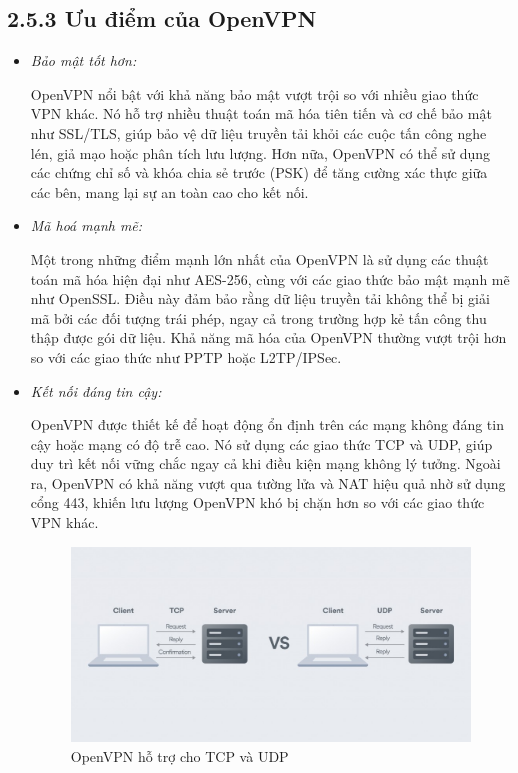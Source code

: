 \subsection*{2.5.3 Ưu điểm của OpenVPN}

\begin{itemize}
        \item \textit{Bảo mật tốt hơn:}
        
         OpenVPN nổi bật với khả năng bảo mật vượt trội so với nhiều giao thức VPN khác. Nó hỗ trợ nhiều thuật toán mã hóa tiên tiến và cơ chế bảo mật như SSL/TLS, giúp bảo vệ dữ liệu truyền tải khỏi các cuộc tấn công nghe lén, giả mạo hoặc phân tích lưu lượng. Hơn nữa, OpenVPN có thể sử dụng các chứng chỉ số và khóa chia sẻ trước (PSK) để tăng cường xác thực giữa các bên, mang lại sự an toàn cao cho kết nối.
        \item \textit{Mã hoá mạnh mẽ:}

        Một trong những điểm mạnh lớn nhất của OpenVPN là sử dụng các thuật toán mã hóa hiện đại như AES-256, cùng với các giao thức bảo mật mạnh mẽ như OpenSSL. Điều này đảm bảo rằng dữ liệu truyền tải không thể bị giải mã bởi các đối tượng trái phép, ngay cả trong trường hợp kẻ tấn công thu thập được gói dữ liệu. Khả năng mã hóa của OpenVPN thường vượt trội hơn so với các giao thức như PPTP hoặc L2TP/IPSec.
       
        \item \textit{Kết nối đáng tin cậy:}

        OpenVPN được thiết kế để hoạt động ổn định trên các mạng không đáng tin cậy hoặc mạng có độ trễ cao. Nó sử dụng các giao thức TCP và UDP, giúp duy trì kết nối vững chắc ngay cả khi điều kiện mạng không lý tưởng. Ngoài ra, OpenVPN có khả năng vượt qua tường lửa và NAT hiệu quả nhờ sử dụng cổng 443, khiến lưu lượng OpenVPN khó bị chặn hơn so với các giao thức VPN khác.
        \begin{figure}[htbp]
        \centering
        \includegraphics[width=0.7\linewidth]{img/openvpn2.jpeg}
        \caption{OpenVPN hỗ trợ cho TCP và UDP}
        \end{figure}
    \end{itemize} 
\newpage
